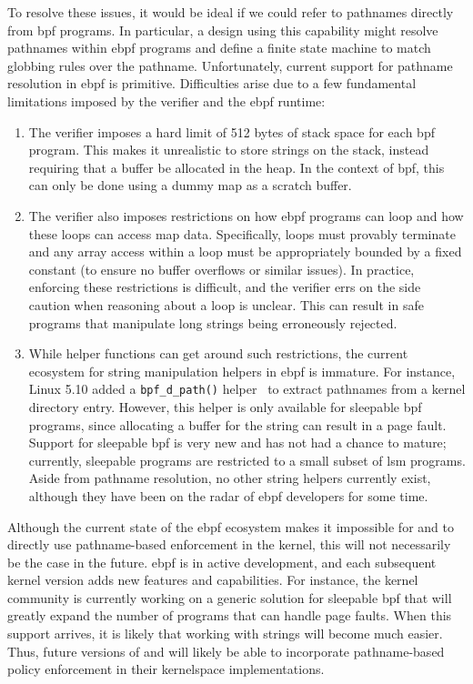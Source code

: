To resolve these issues, it would be ideal if we could refer to pathnames directly from
\gls{bpf} programs. In particular, a design using this capability might resolve pathnames
within \gls{ebpf} programs and define a finite state machine to match globbing rules over
the pathname. Unfortunately, current support for pathname resolution in \gls{ebpf} is primitive.
Difficulties arise due to a few fundamental limitations imposed by the verifier and the \gls{ebpf}
runtime:
\begin{enumerate}
  \item The verifier imposes a hard limit of 512 bytes of stack space for each \gls{bpf}
  program. This makes it unrealistic to store strings on the stack, instead requiring that
  a buffer be allocated in the heap. In the context of \gls{bpf}, this can only be done
  using a dummy map as a scratch buffer.

  \item The verifier also imposes restrictions on how \gls{ebpf} programs can loop and how
  these loops can access map data. Specifically, loops must provably terminate and any
  array access within a loop must be appropriately bounded by a fixed constant (to ensure
  no buffer overflows or similar issues). In practice, enforcing these restrictions is
  difficult, and the verifier errs on the side caution when reasoning about a loop is unclear.
  This can result in safe programs that manipulate long strings being erroneously rejected.

  \item While helper functions can get around such restrictions, the current ecosystem for
  string manipulation helpers in \gls{ebpf} is immature. For instance, Linux 5.10 added
  a \texttt{bpf\_d\_path()} helper~\cite{olsa2020_d_path} to extract pathnames from
  a kernel directory entry. However, this helper is only available for sleepable \gls{bpf}
  programs, since allocating a buffer for the string can result in a page fault. Support
  for sleepable \gls{bpf} is very new and has not had a chance to mature; currently,
  sleepable programs are restricted to a small subset of \gls{lsm} programs. Aside from
  pathname resolution, no other string helpers currently exist, although they have been on
  the radar of \gls{ebpf} developers for some time.
\end{enumerate}

Although the current state of the \gls{ebpf} ecosystem makes it impossible for \bpfbox{}
and \bpfcontain{} to directly use pathname-based enforcement in the kernel, this will not
necessarily be the case in the future. \gls{ebpf} is in active development, and each
subsequent kernel version adds new features and capabilities. For instance, the kernel
community is currently working on a generic solution for sleepable \gls{bpf} that will
greatly expand the number of programs that can handle page faults. When this support
arrives, it is likely that working with strings will become much easier. Thus, future
versions of \bpfbox{} and \bpfcontain{} will likely be able to incorporate pathname-based
policy enforcement in their kernelspace implementations.

